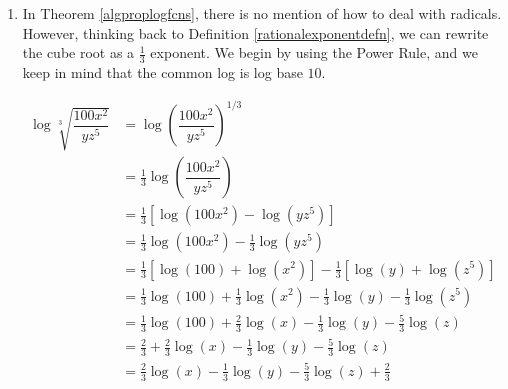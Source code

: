 {\begin{enumerate}
\begin{align*}
\ln \left(\dfrac{3}{ex}\right)^2 & =  2 \ln \left(\dfrac{3}{ex}\right)  \tag*{Power Rule} \\
      & =  2 \left[ \ln(3) - \ln(ex) \right]  \tag*{Quotient Rule} \\
      & =  2 \ln(3) - 2\ln(ex)  \\
      & =  2 \ln(3) - 2\left[\ln(e) + \ln(x)\right]  \tag*{Product Rule} \\
      & =  2 \ln(3) - 2\ln(e) - 2 \ln(x)  \\
      & =  2\ln(3) - 2 - 2 \ln(x)  \tag*{Since $e^{1} = e$} \\
      & =  - 2 \ln(x) + 2\ln(3) - 2  \\
\end{align*}
                        

\item In Theorem \ref{algproplogfcns}, there is no mention of how to deal with radicals.  However, thinking back to Definition \ref{rationalexponentdefn}, we can rewrite the cube root as a $\frac{1}{3}$ exponent.  We begin by using the Power Rule, and we keep in mind that the common log is log base $10$. 


\begin{align*}
\log \sqrt[3]{\dfrac{100 x^2}{yz^5}} & =  \log \left(\dfrac{100 x^2}{yz^5}\right)^{1/3}  \\ 
& =  \frac{1}{3} \log\left(\dfrac{100 x^2}{yz^5}\right)  \tag*{Power Rule} \\ 
& =  \frac{1}{3} \left[ \log\left(100x^2\right) - \log\left(yz^5\right) \right]  \tag*{Quotient Rule} \\ 
& = \frac{1}{3}\log\left(100x^2\right) - \frac{1}{3}\log\left(yz^5\right) \\
& =  \frac{1}{3}\left[ \log(100) + \log\left(x^2\right)\right] - \frac{1}{3} \left[ \log(y) + \log\left(z^5\right) \right]  \tag*{Product Rule} \\
& = \frac{1}{3} \log(100) + \frac{1}{3} \log\left(x^2\right) - \frac{1}{3} \log(y) - \frac{1}{3} \log\left(z^5\right) \\
& =  \frac{1}{3} \log(100) + \frac{2}{3} \log(x) - \frac{1}{3} \log(y) - \frac{5}{3} \log(z)  \tag*{Power Rule} \\
& =  \frac{2}{3} + \frac{2}{3} \log(x) - \frac{1}{3} \log(y) - \frac{5}{3} \log(z)  \tag*{Since $10^2=100$} \\
& =   \frac{2}{3} \log(x) - \frac{1}{3} \log(y) - \frac{5}{3} \log(z) + \frac{2}{3} 
\end{align*}


\end{enumerate}}
